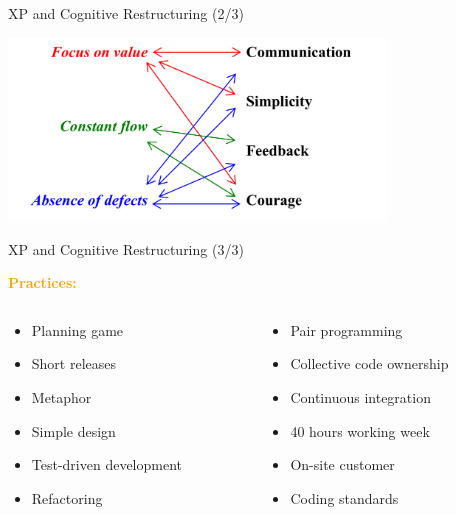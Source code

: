 \documentclass{beamer}
\begin{document}
\begin{frame}{\centerline{ XP and Cognitive Restructuring (2/3)}}

\begin{center}
 \includegraphics[width=10cm]{P2023.AIBCCSS.Change/valuesDrivers.XP.png}
 
 \end{center}

\end{frame}

\begin{frame}{\centerline{XP and Cognitive Restructuring (3/3)}}

\begin{center}
\textcolor{orange}{\bf Practices:}
\end{center}

\begin{columns}
\begin{column}{0.5\textwidth}

\begin{itemize}
\item  Planning game
\item Short releases
\item Metaphor
\item  Simple design
\item Test-driven development
\item  Refactoring
\end{itemize}

\end{column}
\begin{column}{0.5\textwidth} 

\begin{itemize}
\item  Pair programming
\item Collective code ownership
\item Continuous integration
\item 40 hours working week
\item On-site customer
\item Coding standards
\end{itemize}
\end{column}

\end{columns}

\end{frame}
\end{document}
